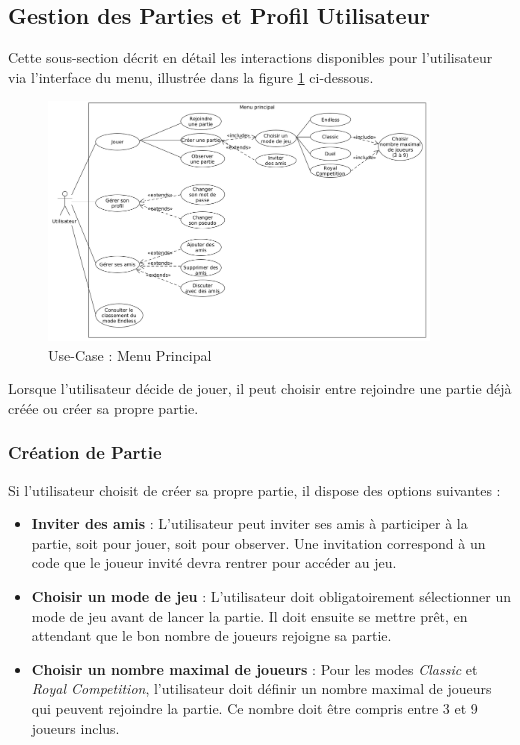 \documentclass{report}
\begin{document}
\subsection{Gestion des Parties et Profil Utilisateur}

\noindent Cette sous-section décrit en détail les interactions disponibles pour l'utilisateur via l'interface du menu, illustrée dans la figure \ref{fig:use_case_menu} ci-dessous. 

\vspace{-1em}

\begin{figure}[H]
    \centering
     \includegraphics[width=0.9\textwidth, keepaspectratio]{src/user_req/menu.png}
    \caption{Use-Case : Menu Principal}
    \label{fig:use_case_menu}
\end{figure}

\noindent Lorsque l'utilisateur décide de jouer, il peut choisir entre rejoindre une partie déjà créée ou créer sa propre partie.

\subsubsection{Création de Partie}

\noindent Si l'utilisateur choisit de créer sa propre partie, il dispose des options suivantes :
\begin{itemize}
    \item \textbf{Inviter des amis} : L'utilisateur peut inviter ses amis à participer à la partie, soit pour jouer, soit pour observer. Une invitation correspond à un code que le joueur invité devra rentrer pour accéder au jeu.
    \item \textbf{Choisir un mode de jeu} : L'utilisateur doit obligatoirement sélectionner un mode de jeu avant de lancer la partie. Il doit ensuite se mettre prêt, en attendant que le bon nombre de joueurs rejoigne sa partie.
    \item \textbf{Choisir un nombre maximal de joueurs} : Pour les modes \emph{Classic} et \emph{Royal Competition}, l'utilisateur doit définir un nombre maximal de joueurs qui peuvent rejoindre la partie. Ce nombre doit être compris entre 3 et 9 joueurs inclus.
\end{itemize}
\end{document}
